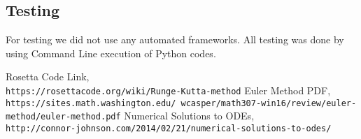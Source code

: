 \documentclass[a4paper,10pt]{article}
\begin{document}
\subsection{Testing}
For testing we did not use any automated frameworks. All testing was done by using Command Line execution of Python codes.
\medskip
\begin{thebibliography}{9}
 Rosetta Code Link, \\\texttt{https://rosettacode.org/wiki/Runge-Kutta-method}
 Euler Method PDF, \\\texttt{https://sites.math.washington.edu/~wcasper/math307-win16/review/euler-method/euler-method.pdf}
 Numerical Solutions to ODEs, \\\texttt{http://connor-johnson.com/2014/02/21/numerical-solutions-to-odes/}
\end{thebibliography}
\end{document}
